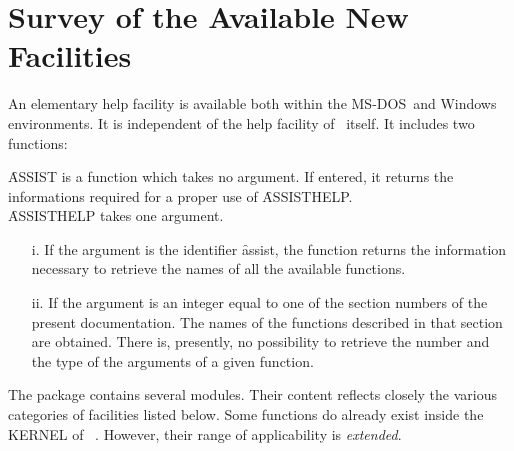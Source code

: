 \section{ Survey of the Available New Facilities}
An elementary help facility is available both within
the MS-DOS\ and Windows environments. It is independent of the
help facility of \REDUCE\ itself. It includes two functions:

\f{ASSIST} is a function which takes no argument. If entered, it returns 
the informations required for a proper use  of \f{ASSISTHELP}.\\   
\f{ASSISTHELP} takes one argument.   
\begin{itemize}
\item[i.] If the argument is the identifier \f{assist}, the function 
returns the information necessary to retrieve the names of all the available
functions.
\item[ii.] If the argument is an integer equal to one of the section numbers
of the present documentation. The names of the functions described
in that section are obtained.\nl
There is, presently, no possibility to retrieve the number and the type of 
the arguments of a given function.
\end{itemize}
The package contains several modules. Their content reflects closely
the various categories of facilities listed below. Some functions do
already exist inside the KERNEL of \REDUCE\ . However, their range
of applicability is {\em extended}.\nl

